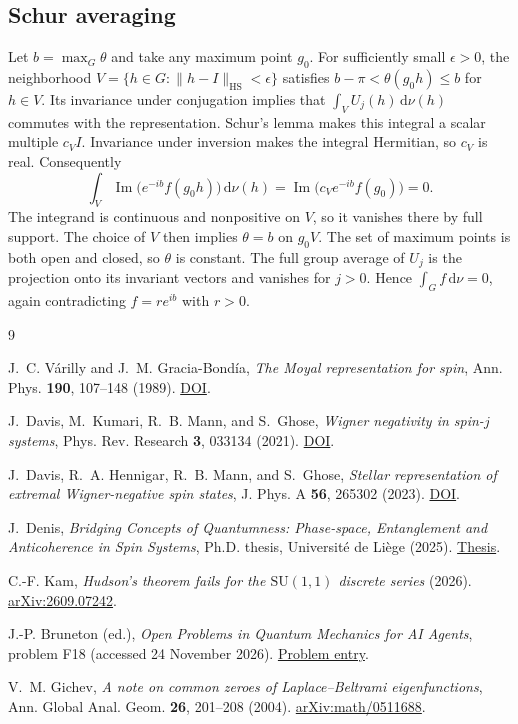 \documentclass[11pt,a4paper]{article}
\newcommand{\SU}{\mathrm{SU}}
\newcommand{\dd}{\,\mathrm{d}}
\begin{document}
\subsection{Schur averaging}

Let \(b=\max_G\theta\) and take any maximum point \(g_0\).
For sufficiently small \(\epsilon>0\), the neighborhood
\(V=\{h\in G:\|h-I\|_{\mathrm{HS}}<\epsilon\}\) satisfies
\(b-\pi<\theta(g_0h)\leq b\) for \(h\in V\).
Its invariance under conjugation implies that
\(\int_V U_j(h)\dd\nu(h)\) commutes with the representation.
Schur's lemma makes this integral a scalar multiple \(c_V I\).
Invariance under inversion makes the integral Hermitian, so \(c_V\)
is real. Consequently
\[
  \int_V\operatorname{Im}\bigl(e^{-ib}f(g_0h)\bigr)\dd\nu(h)
  =\operatorname{Im}\bigl(c_V e^{-ib}f(g_0)\bigr)=0 .
\]
The integrand is continuous and nonpositive on \(V\), so it
vanishes there by full support. The choice of \(V\) then implies
\(\theta=b\) on \(g_0V\). The set of maximum points is both open and
closed, so \(\theta\) is constant. The full group average of \(U_j\)
is the projection onto its invariant vectors and vanishes for
\(j>0\). Hence \(\int_G f\dd\nu=0\), again contradicting
\(f=r e^{ib}\) with \(r>0\).

\begin{thebibliography}{9}
\small
\raggedright
\setlength{\itemsep}{3pt}

J.~C. V\'arilly and J.~M. Gracia-Bond\'ia,
\emph{The Moyal representation for spin},
Ann. Phys. \textbf{190}, 107--148 (1989).
\href{https://doi.org/10.1016/0003-4916(89)90262-5}{DOI}.

J.~Davis, M.~Kumari, R.~B. Mann, and S.~Ghose,
\emph{Wigner negativity in spin-\(j\) systems},
Phys. Rev. Research \textbf{3}, 033134 (2021).
\href{https://doi.org/10.1103/PhysRevResearch.3.033134}{DOI}.

J.~Davis, R.~A. Hennigar, R.~B. Mann, and S.~Ghose,
\emph{Stellar representation of extremal Wigner-negative spin states},
J. Phys. A \textbf{56}, 265302 (2023).
\href{https://doi.org/10.1088/1751-8121/acd918}{DOI}.

J.~Denis, \emph{Bridging Concepts of Quantumness: Phase-space,
Entanglement and Anticoherence in Spin Systems},
Ph.D. thesis, Universit\'e de Li\`ege (2025).
\href{https://hdl.handle.net/2268/336540}{Thesis}.

C.-F. Kam, \emph{Hudson's theorem fails for the \(\SU(1,1)\)
discrete series} (2026).
\href{https://arxiv.org/abs/2609.07242}{\mbox{arXiv:2609.07242}}.

J.-P. Bruneton (ed.), \emph{Open Problems in Quantum Mechanics
for AI Agents}, problem F18 (accessed 24 November 2026).
\href{https://openquantumproblems.com/p/F18}{Problem entry}.

V.~M. Gichev, \emph{A note on common zeroes of Laplace--Beltrami
eigenfunctions}, Ann. Global Anal. Geom. \textbf{26}, 201--208 (2004).
\href{https://arxiv.org/abs/math/0511688}{\mbox{arXiv:math/0511688}}.

\end{thebibliography}
\end{document}
